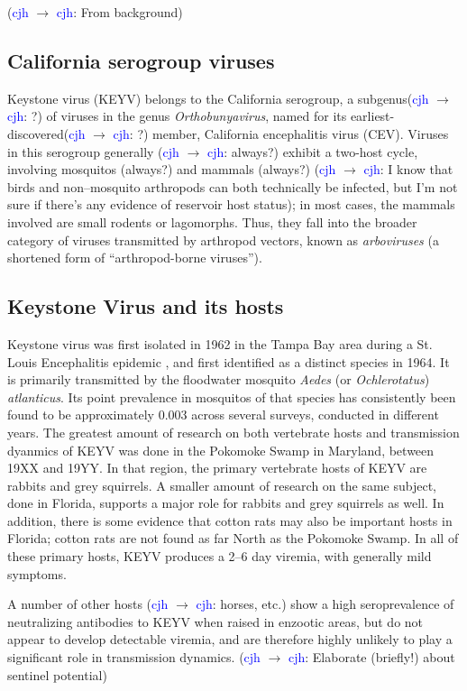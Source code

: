\documentclass[12pt]{article}
\newcommand{\cjh}{\textcolor{blue}{cjh}}
\newcommand{\msg}[3]{(#1 $\rightarrow$ #2: #3)}
\newcommand{\mcc}[1]{\msg\cjh\cjh{#1}}
\begin{document}
        \mcc{From background}
        \subsection{California serogroup viruses}
            Keystone virus (KEYV) belongs to the California serogroup, a subgenus\mcc{?} of viruses in the genus \textit{Orthobunyavirus}, named for its earliest-discovered\mcc{?} member, California encephalitis virus (CEV). Viruses in this serogroup generally \mcc{always?} exhibit a two-host cycle, involving mosquitos (always?) and mammals (always?) \mcc{I know that birds and non--mosquito arthropods can both technically be infected, but I'm not sure if there's any evidence of reservoir host status}; in most cases, the mammals involved are small rodents or lagomorphs. Thus, they fall into the broader category of viruses transmitted by arthropod vectors, known as \textit{arboviruses} (a shortened form of ``arthropod-borne viruses'').
        
        \subsection{Keystone Virus and its hosts}
            Keystone virus was first isolated in 1962 in the Tampa Bay area during a St. Louis Encephalitis epidemic \cite{asdf}, and first identified as a distinct species in 1964. It is primarily transmitted by the floodwater mosquito \textit{Aedes} (or \textit{Ochlerotatus}) \textit{atlanticus}. Its point prevalence in mosquitos of that species has consistently been found to be approximately 0.003 across several surveys, conducted in different years. The greatest amount of research on both vertebrate hosts and transmission dyanmics of KEYV was done in the Pokomoke Swamp in Maryland, between 19XX and 19YY. In that region, the primary vertebrate hosts of KEYV are rabbits and grey squirrels. A smaller amount of research on the same subject, done in Florida, supports a major role for rabbits and grey squirrels as well. In addition, there is some evidence that cotton rats may also be important hosts in Florida\cite{asdf}; cotton rats are not found as far North as the Pokomoke Swamp. In all of these primary hosts, KEYV produces a 2--6 day viremia, with generally mild symptoms.

            A number of other hosts \mcc{horses, etc.} show a high seroprevalence of neutralizing antibodies to KEYV when raised in enzootic areas, but do not appear to develop detectable viremia, and are therefore highly unlikely to play a significant role in transmission dynamics. \mcc{Elaborate (briefly!) about sentinel potential}
\end{document}
